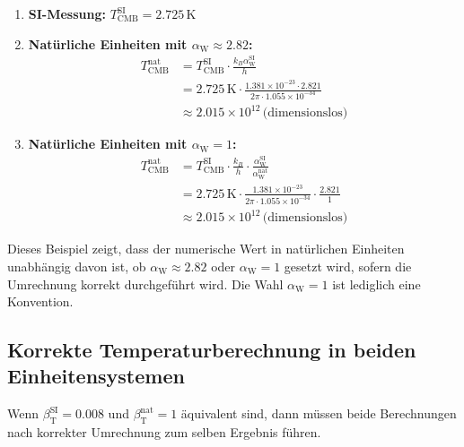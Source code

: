 \documentclass[12pt,a4paper]{article}
\newcommand{\betaT}{\beta_{\text{T}}}
\newcommand{\alphaW}{\alpha_{\text{W}}}
\begin{document}
	\begin{enumerate}
		\item \textbf{SI-Messung:} \(T_{\text{CMB}}^{\text{SI}} = 2.725 \, \text{K}\)
		\item \textbf{Natürliche Einheiten mit \(\alphaW \approx 2.82\):}
		\begin{align}
			T_{\text{CMB}}^{\text{nat}} &= T_{\text{CMB}}^{\text{SI}} \cdot \frac{k_B \alphaW^{\text{SI}}}{h} \\
			&= 2.725 \, \text{K} \cdot \frac{1.381 \times 10^{-23} \cdot 2.821}{2\pi \cdot 1.055 \times 10^{-34}} \\
			&\approx 2.015 \times 10^{12} \, \text{(dimensionslos)}
		\end{align}
		\item \textbf{Natürliche Einheiten mit \(\alphaW = 1\):}
		\begin{align}
			T_{\text{CMB}}^{\text{nat}} &= T_{\text{CMB}}^{\text{SI}} \cdot \frac{k_B}{h} \cdot \frac{\alphaW^{\text{SI}}}{\alphaW^{\text{nat}}} \\
			&= 2.725 \, \text{K} \cdot \frac{1.381 \times 10^{-23}}{2\pi \cdot 1.055 \times 10^{-34}} \cdot \frac{2.821}{1} \\
			&\approx 2.015 \times 10^{12} \, \text{(dimensionslos)}
		\end{align}
	\end{enumerate}
	
	Dieses Beispiel zeigt, dass der numerische Wert in natürlichen Einheiten unabhängig davon ist, ob \(\alphaW \approx 2.82\) oder \(\alphaW = 1\) gesetzt wird, sofern die Umrechnung korrekt durchgeführt wird. Die Wahl \(\alphaW = 1\) ist lediglich eine Konvention.
	
	\subsection{Korrekte Temperaturberechnung in beiden Einheitensystemen}
	
	Wenn \(\betaT^{\text{SI}} = 0.008\) und \(\betaT^{\text{nat}} = 1\) äquivalent sind, dann müssen beide Berechnungen nach korrekter Umrechnung zum selben Ergebnis führen.
	
\end{document}
